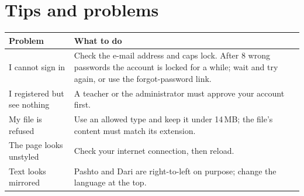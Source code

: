 \documentclass[11pt,a4paper]{article}
\begin{document}
\section{Tips and problems}
\begin{longtable}{@{}p{5cm}p{9.2cm}@{}}
\toprule\textbf{Problem} & \textbf{What to do}\\\midrule\endhead
I cannot sign in & Check the e-mail address and caps lock. After 8 wrong passwords the account is locked for a while; wait and try again, or use the forgot-password link.\\
I registered but see nothing & A teacher or the administrator must approve your account first.\\
My file is refused & Use an allowed type and keep it under 14\,MB; the file's content must match its extension.\\
The page looks unstyled & Check your internet connection, then reload.\\
Text looks mirrored & Pashto and Dari are right-to-left on purpose; change the language at the top.\\
\bottomrule\end{longtable}

\printglossary[title=Glossary]
\end{document}
